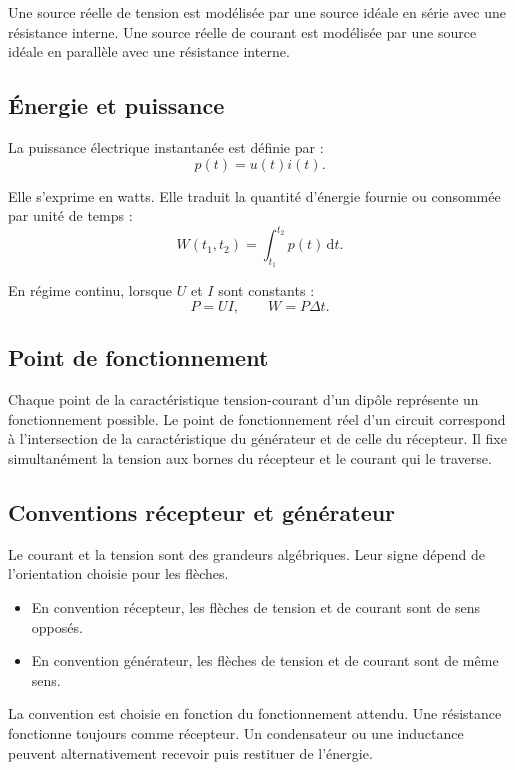 Une source réelle de tension est modélisée par une source idéale en série avec une résistance interne. Une source réelle de courant est modélisée par une source idéale en parallèle avec une résistance interne.

\subsection{Énergie et puissance}

La puissance électrique instantanée est définie par :
\[
p(t)=u(t)i(t).
\]

Elle s'exprime en watts. Elle traduit la quantité d'énergie fournie ou consommée par unité de temps :
\[
W(t_1,t_2)=\int_{t_1}^{t_2}p(t)\,\mathrm{d}t.
\]

En régime continu, lorsque $U$ et $I$ sont constants :
\[
P=UI,
\qquad
W=P\Delta t.
\]

\subsection{Point de fonctionnement}

Chaque point de la caractéristique tension-courant d'un dipôle représente un fonctionnement possible. Le point de fonctionnement réel d'un circuit correspond à l'intersection de la caractéristique du générateur et de celle du récepteur. Il fixe simultanément la tension aux bornes du récepteur et le courant qui le traverse.

\subsection{Conventions récepteur et générateur}

Le courant et la tension sont des grandeurs algébriques. Leur signe dépend de l'orientation choisie pour les flèches.

\begin{itemize}
  \item En convention récepteur, les flèches de tension et de courant sont de sens opposés.
  \item En convention générateur, les flèches de tension et de courant sont de même sens.
\end{itemize}

La convention est choisie en fonction du fonctionnement attendu. Une résistance fonctionne toujours comme récepteur. Un condensateur ou une inductance peuvent alternativement recevoir puis restituer de l'énergie.

